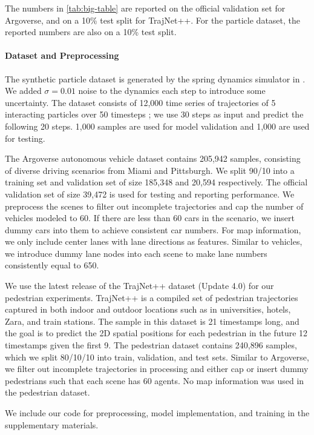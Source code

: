 The numbers  in \autoref{tab:big-table} are reported on the official validation set for Argoverse, and on a 10\% test split for TrajNet++. For the particle dataset, the reported numbers are also on a 10\% test split.

\paragraph{Dataset and Preprocessing} 
The synthetic particle dataset is generated by the spring dynamics simulator in \cite{nri}. We added $\sigma=0.01$ noise to the dynamics each step to introduce some uncertainty. The dataset consists of 12,000 time series of trajectories of 5 interacting particles over 50 timesteps ; we use 30 steps as input and predict the following 20 steps. 1,000 samples are used for model validation and 1,000 are used for testing.

The Argoverse autonomous vehicle dataset contains 205,942 samples, consisting of diverse driving scenarios from Miami and Pittsburgh.  We split 90/10 into a training set and validation set of size 185,348 and 20,594 respectively. The official validation set of size 39,472 is used for testing and reporting performance. We preprocess the scenes to filter out incomplete trajectories and cap the number of vehicles modeled to 60. If there are less than 60 cars in the scenario, we insert dummy cars into them to achieve consistent car numbers. For map information, we only include center lanes with lane directions as features. Similar to vehicles, we introduce dummy lane nodes into each scene to make lane numbers consistently equal to 650.

We use the latest release of the TrajNet++ dataset (Update 4.0) for our pedestrian experiments. TrajNet++ is a compiled set of pedestrian trajectories captured in both
indoor and outdoor locations such as in universities, hotels, Zara, and train stations. The sample in this dataset is 21 timestamps long, and the goal is to predict the 2D spatial positions for each pedestrian in the future 12 timestamps given the first 9.
The pedestrian dataset contains 240,896 samples, which we split 80/10/10 into train, validation, and test sets. Similar to Argoverse, we filter out incomplete trajectories in processing and either cap or insert dummy pedestrians such that each scene has 60 agents. No map information was used in the pedestrian dataset. 

We include our code for preprocessing, model implementation, and training in the supplementary materials.

